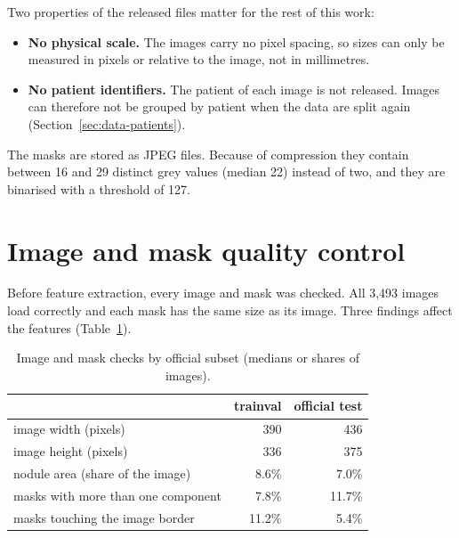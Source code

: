 Two properties of the released files matter for the rest of this work:

\begin{itemize}
  \item \textbf{No physical scale.} The images carry no pixel spacing, so sizes can only be
        measured in pixels or relative to the image, not in millimetres.
  \item \textbf{No patient identifiers.} The patient of each image is not released. Images can
        therefore not be grouped by patient when the data are split again
        (Section~\ref{sec:data-patients}).
\end{itemize}

The masks are stored as JPEG files. Because of compression they contain between 16 and 29
distinct grey values (median 22) instead of two, and they are binarised with a threshold of 127.

\section{Image and mask quality control}
\label{sec:data-qc}

Before feature extraction, every image and mask was checked. All 3,493 images load correctly
and each mask has the same size as its image. Three findings affect the features
(Table~\ref{tab:data-qc}).

\begin{table}[ht]
  \centering
  \caption{Image and mask checks by official subset (medians or shares of images).}
  \label{tab:data-qc}
  \begin{tabular}{lrr}
    \toprule
    & trainval & official test \\
    \midrule
    image width (pixels)               & 390    & 436 \\
    image height (pixels)              & 336    & 375 \\
    nodule area (share of the image)   & 8.6\%  & 7.0\% \\
    masks with more than one component & 7.8\%  & 11.7\% \\
    masks touching the image border    & 11.2\% & 5.4\% \\
    \bottomrule
  \end{tabular}
\end{table}

